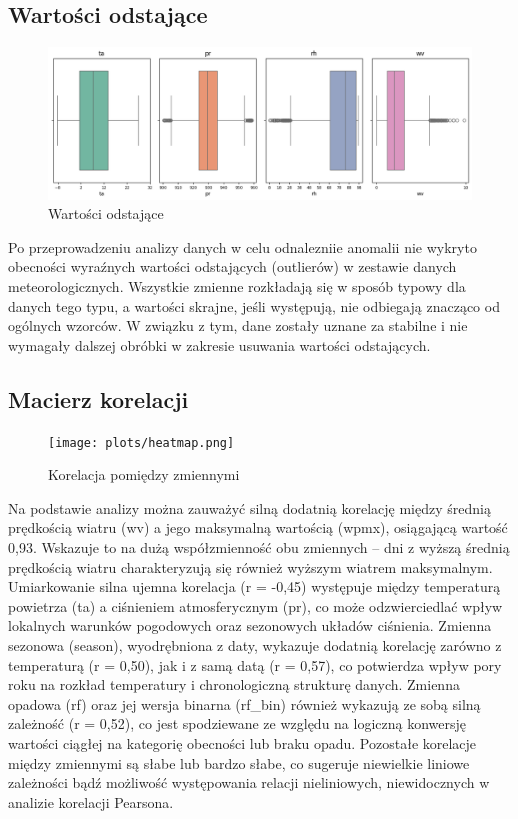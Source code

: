 \documentclass[10pt,a4paper]{article}
\begin{document}
\subsection*{Wartości odstające}
\begin{figure}[H]
	\centering
	\includegraphics[scale=0.5]{boxplot.png}
	\caption{Wartości odstające}
	\label{fig:my_label}
\end{figure}
\noindent Po przeprowadzeniu analizy danych w celu odnalezniie anomalii nie wykryto obecności wyraźnych wartości odstających (outlierów) w zestawie danych meteorologicznych. Wszystkie zmienne rozkładają się w sposób typowy dla danych tego typu, a wartości skrajne, jeśli występują, nie odbiegają znacząco od ogólnych wzorców. W związku z tym, dane zostały uznane za stabilne i nie wymagały dalszej obróbki w zakresie usuwania wartości odstających.


\vspace{1.5em} 
\subsection*{Macierz korelacji}
\begin{figure}[H]
	\centering
	\texttt{[image: plots/heatmap.png]}
	\caption{Korelacja pomiędzy zmiennymi}
	\label{fig:my_label}
\end{figure}
Na podstawie analizy można zauważyć silną dodatnią korelację między średnią prędkością wiatru (wv) a jego maksymalną wartością (wpmx), osiągającą wartość 0,93. Wskazuje to na dużą współzmienność obu zmiennych – dni z wyższą średnią prędkością wiatru charakteryzują się również wyższym wiatrem maksymalnym. Umiarkowanie silna ujemna korelacja (r = -0,45) występuje między temperaturą powietrza (ta) a ciśnieniem atmosferycznym (pr), co może odzwierciedlać wpływ lokalnych warunków pogodowych oraz sezonowych układów ciśnienia. Zmienna sezonowa (season), wyodrębniona z daty, wykazuje dodatnią korelację zarówno z temperaturą (r = 0,50), jak i z samą datą (r = 0,57), co potwierdza wpływ pory roku na rozkład temperatury i chronologiczną strukturę danych.
Zmienna opadowa (rf) oraz jej wersja binarna (rf\_bin) również wykazują ze sobą silną zależność (r = 0,52), co jest spodziewane ze względu na logiczną konwersję wartości ciągłej na kategorię obecności lub braku opadu. Pozostałe korelacje między zmiennymi są słabe lub bardzo słabe, co sugeruje niewielkie liniowe zależności bądź możliwość występowania relacji nieliniowych, niewidocznych w analizie korelacji Pearsona.
\end{document}
